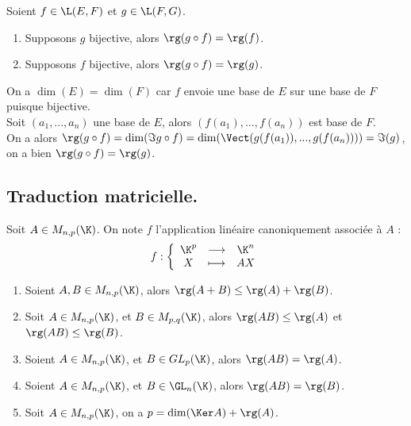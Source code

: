 \documentclass[11pt]{article}
\begin{document}
\vspace*{-0.7cm}

\begin{prop}{}{}
    Soient $f\in\L(E,F)$ et $g\in\L(F,G)$.
    \begin{enumerate}
        \item Supposons $g$ bijective, alors $\rg(g\circ f)=\rg(f)$.
        \item Supposons $f$ bijective, alors $\rg(g\circ f)=\rg(g)$.
    \end{enumerate}
    \tcblower
     On a $\dim(E)=\dim(F)$ car $f$ envoie une base de $E$ sur une base de $F$ puisque bijective.\\
    Soit $(a_1,...,a_n)$ une base de $E$, alors $(f(a_1),...,f(a_n))$ est base de $F$.\\
    On a alors $\rg(g\circ f)=\dim(\Im g\circ f)=\dim(\Vect(g(f(a_1)),...,g(f(a_n))))=\Im(g)$, on a bien $\rg(g\circ f)=\rg(g)$.
\end{prop}

\vspace*{-0.7cm}

\subsection*{Traduction matricielle.}

\begin{defi}{}{}
    Soit $A\in M_{n,p}(\K)$. On note $f$ l'application linéaire canoniquement associée à $A$ :
    \begin{equation*}
        f : \left\{ \begin{array}{ccc}
            \K^p & \longrightarrow & \K^n \\
            X & \longmapsto & AX
        \end{array}\right.
    \end{equation*}
\end{defi}

\vspace*{-0.7cm}

\begin{prop}{}{}
    \begin{enumerate}
        \item Soient $A,B\in M_{n,p}(\K)$, alors $\rg(A+B)\leq\rg(A)+\rg(B)$.
        \item Soit $A\in M_{n,p}(\K)$, et $B\in M_{p,q}(\K)$, alors $\rg(AB)\leq \rg(A)$ et $\rg(AB)\leq \rg(B)$.
        \item Soient $A\in M_{n,p}(\K)$, et $B\in GL_p(\K)$, alors $\rg(AB)=\rg(A)$.
        \item Soient $A\in M_{n,p}(\K)$, et $B\in\GL_n(\K)$, alors $\rg(AB)=\rg(B)$.
        \item Soit $A\in M_{n,p}(\K)$, on a $p=\dim(\Ker A)+\rg(A)$.
    \end{enumerate}
\end{prop}
\end{document}
